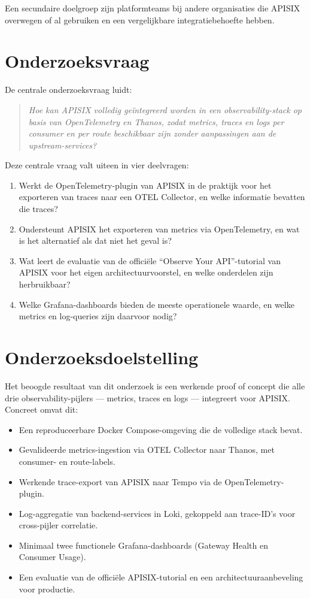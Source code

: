 Een secundaire doelgroep zijn platformteams bij andere organisaties die APISIX overwegen of al gebruiken en een vergelijkbare integratiebehoefte hebben.

\section{Onderzoeksvraag}%
\label{sec:onderzoeksvraag}

De centrale onderzoeksvraag luidt:

\begin{quote}
\textit{Hoe kan APISIX volledig geïntegreerd worden in een observability-stack op basis van OpenTelemetry en Thanos, zodat metrics, traces en logs per consumer en per route beschikbaar zijn zonder aanpassingen aan de upstream-services?}
\end{quote}

Deze centrale vraag valt uiteen in vier deelvragen:

\begin{enumerate}
  \item Werkt de OpenTelemetry-plugin van APISIX in de praktijk voor het exporteren van traces naar een OTEL Collector, en welke informatie bevatten die traces?
  \item Ondersteunt APISIX het exporteren van metrics via OpenTelemetry, en wat is het alternatief als dat niet het geval is?
  \item Wat leert de evaluatie van de officiële ``Observe Your API''-tutorial van APISIX voor het eigen architectuurvoorstel, en welke onderdelen zijn herbruikbaar?
  \item Welke Grafana-dashboards bieden de meeste operationele waarde, en welke metrics en log-queries zijn daarvoor nodig?
\end{enumerate}

\section{Onderzoeksdoelstelling}%
\label{sec:onderzoeksdoelstelling}

Het beoogde resultaat van dit onderzoek is een werkende proof of concept die alle drie observability-pijlers --- metrics, traces en logs --- integreert voor APISIX. Concreet omvat dit:

\begin{itemize}
  \item Een reproduceerbare Docker Compose-omgeving die de volledige stack bevat.
  \item Gevalideerde metrics-ingestion via OTEL Collector naar Thanos, met consumer- en route-labels.
  \item Werkende trace-export van APISIX naar Tempo via de OpenTelemetry-plugin.
  \item Log-aggregatie van backend-services in Loki, gekoppeld aan trace-ID's voor cross-pijler correlatie.
  \item Minimaal twee functionele Grafana-dashboards (Gateway Health en Consumer Usage).
  \item Een evaluatie van de officiële APISIX-tutorial en een architectuuraanbeveling voor productie.
\end{itemize}

